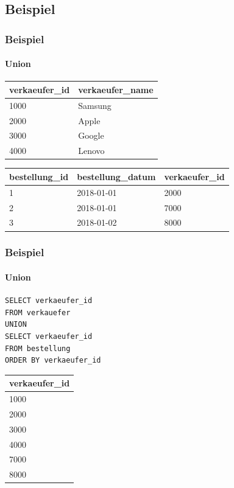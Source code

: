 \documentclass[10pt,a4paper]{beamer}
\begin{document}
\subsection{Beispiel}
\begin{frame}[fragile]
\frametitle{Beispiel}
\framesubtitle{Union}
\begin{tabular}{l|l}
\textbf{verkaeufer\_id} & \textbf{verkaeufer\_name} \\ \hline
1000           & Samsung          \\
2000           & Apple            \\
3000           & Google           \\
4000           & Lenovo           \\
\end{tabular} 
\newline
\vspace*{1 cm}
\newline
\begin{tabular}{l|l|l}
\textbf{bestellung\_id} & \textbf{bestellung\_datum} & \textbf{verkaeufer\_id} \\ \hline
1              & 2018-01-01        & 2000           \\
2              & 2018-01-01        & 7000           \\
3              & 2018-01-02        & 8000           \\
\end{tabular}
\end{frame}

\begin{frame}[fragile]
\frametitle{Beispiel}
\framesubtitle{Union}
\begin{lstlisting}
SELECT verkaeufer_id 
FROM verkauefer
UNION
SELECT verkaeufer_id 
FROM bestellung
ORDER BY verkaeufer_id 
\end{lstlisting}
\pause
\begin{tabular}{l}
\textbf{verkaeufer\_id} \\ \hline
1000 \\
2000 \\
3000 \\
4000 \\
7000 \\ 
8000
\end{tabular}
\end{frame}
\end{document}

